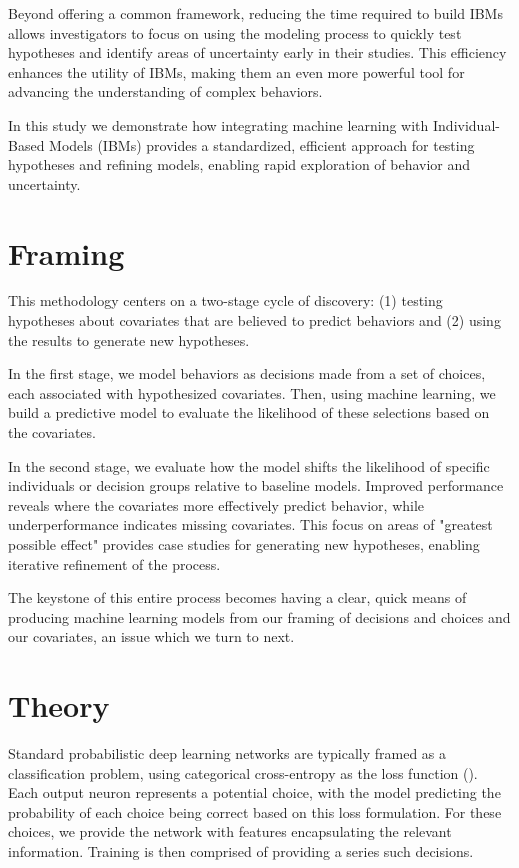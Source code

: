 \documentclass[11pt]{article}
\begin{document}
Beyond offering a common framework, reducing the time required to build IBMs allows investigators to focus on using the modeling process to quickly test hypotheses and identify areas of uncertainty early in their studies. This efficiency enhances the utility of IBMs, making them an even more powerful tool for advancing the understanding of complex behaviors.

In this study we demonstrate how integrating machine learning with Individual-Based Models (IBMs) provides a standardized, efficient approach for testing hypotheses and refining models, enabling rapid exploration of behavior and uncertainty.

\section*{Framing}

This methodology centers on a two-stage cycle of discovery: (1) testing hypotheses about covariates that are believed to predict behaviors and (2) using the results to generate new hypotheses.

In the first stage, we model behaviors as decisions made from a set of choices, each associated with hypothesized covariates. Then, using machine learning, we build a predictive model to evaluate the likelihood of these selections based on the covariates.

In the second stage, we evaluate how the model shifts the likelihood of specific individuals or decision groups relative to baseline models. Improved performance reveals where the covariates more effectively predict behavior, while underperformance indicates missing covariates. This focus on areas of "greatest possible effect" provides case studies for generating new hypotheses, enabling iterative refinement of the process.

The keystone of this entire process becomes having a clear, quick means of producing machine learning models from our framing of decisions and choices and our covariates, an issue which we turn to next. 

\section*{Theory}

Standard probabilistic deep learning networks are typically framed as a classification problem, using categorical cross-entropy as the loss function (\cite{durr}). Each output neuron represents a potential choice, with the model predicting the probability of each choice being correct based on this loss formulation. For these choices, we provide the network with features encapsulating the relevant information. Training is then comprised of providing a series such decisions. 
\end{document}
